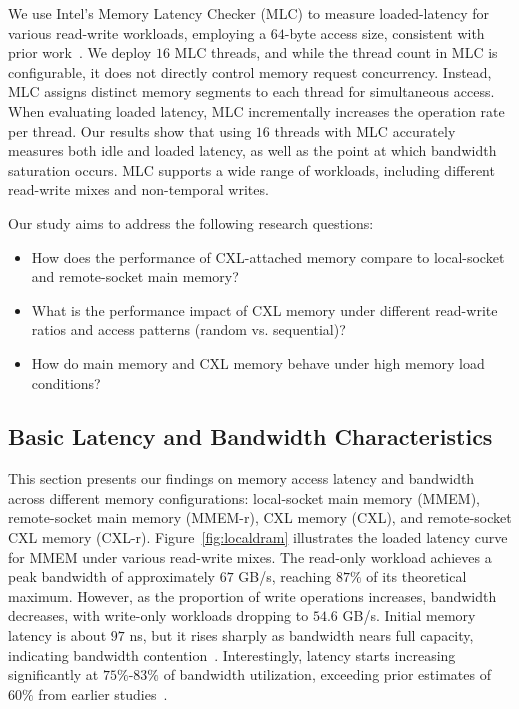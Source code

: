  We use Intel's Memory Latency Checker (MLC) to measure loaded-latency for various read-write workloads, employing a $64$-byte access size, consistent with prior work~\cite{demystify}. We deploy $16$ MLC threads, and while the thread count in MLC is configurable, it does not directly control memory request concurrency. Instead, MLC assigns distinct memory segments to each thread for simultaneous access. When evaluating loaded latency, MLC incrementally increases the operation rate per thread. Our results show that using $16$ threads with MLC accurately measures both idle and loaded latency, as well as the point at which bandwidth saturation occurs. MLC supports a wide range of workloads, including different read-write mixes and non-temporal writes.

Our study aims to address the following research questions:

\begin{itemize}
    \item How does the performance of CXL-attached memory compare to local-socket and remote-socket main memory?
    \item What is the performance impact of CXL memory under different read-write ratios and access patterns (random vs. sequential)?
    \item How do main memory and CXL memory behave under high memory load conditions?
\end{itemize}



\subsection{Basic Latency and Bandwidth Characteristics}
\label{ssec:performance}
This section presents our findings on memory access latency and bandwidth across different memory configurations: local-socket main memory (MMEM), remote-socket main memory (MMEM-r), CXL memory (CXL), and remote-socket CXL memory (CXL-r). Figure~\ref{fig:localdram} illustrates the loaded latency curve for MMEM under various read-write mixes. The read-only workload achieves a peak bandwidth of approximately $67$ GB/s, reaching $87\%$ of its theoretical maximum. However, as the proportion of write operations increases, bandwidth decreases, with write-only workloads dropping to $54.6$ GB/s. Initial memory latency is about $97$ ns, but it rises sharply as bandwidth nears full capacity, indicating bandwidth contention~\cite{cxl-centric, mt2}. Interestingly, latency starts increasing significantly at $75\%$-$83\%$ of bandwidth utilization, exceeding prior estimates of $60\%$ from earlier studies~\cite{cxl-centric}.

